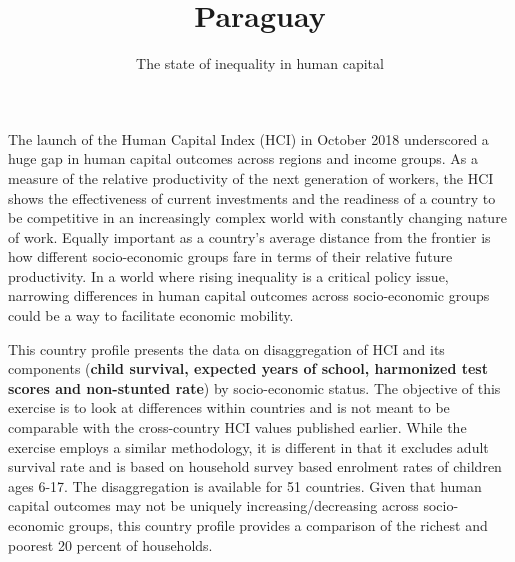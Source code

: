 \documentclass[8pt,]{article}
\title{Paraguay}
\author{The state of inequality in human capital}
\date{}
\begin{document}
\maketitle

\newcommand\boldblue[1]{\textcolor{bondiblue}{\textbf{#1}}}

The launch of the Human Capital Index (HCI) in October 2018 underscored
a huge gap in human capital outcomes across regions and income groups.
As a measure of the relative productivity of the next generation of
workers, the HCI shows the effectiveness of current investments and the
readiness of a country to be competitive in an increasingly complex
world with constantly changing nature of work. Equally important as a
country's average distance from the frontier is how different
socio-economic groups fare in terms of their relative future
productivity. In a world where rising inequality is a critical policy
issue, narrowing differences in human capital outcomes across
socio-economic groups could be a way to facilitate economic mobility.

This country profile presents the data on disaggregation of HCI and its
components (\textbf{child survival, expected years of school, harmonized
test scores and non-stunted rate}) by socio-economic status. The
objective of this exercise is to look at differences within countries
and is not meant to be comparable with the cross-country HCI values
published earlier. While the exercise employs a similar methodology, it
is different in that it excludes adult survival rate and is based on
household survey based enrolment rates of children ages 6-17. The
disaggregation is available for 51 countries. Given that human capital
outcomes may not be uniquely increasing/decreasing across socio-economic
groups, this country profile provides a comparison of the richest and
poorest 20 percent of households.
\end{document}
